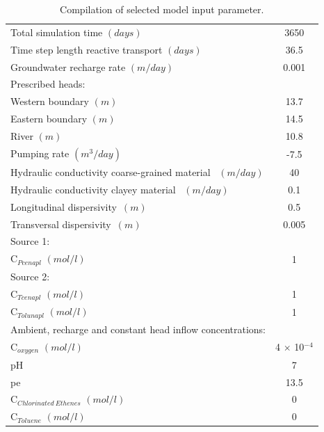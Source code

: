 \begin{table}
\caption{Compilation of selected model input parameter.}
\begin{center}
\begin{tabular}{lc} \hline
Total simulation time $(days)$       & 3650  \\
Time step length reactive transport $(days)$   & 36.5 \\
Groundwater recharge rate $(m/day)$   & 0.001 \\ 
\midrule 
Prescribed heads: & \\
Western boundary  $(m)$  &  13.7 \\
Eastern boundary  $(m)$  &  14.5 \\ 
River  $(m)$  &  10.8 \\
\midrule 
Pumping rate $(m^3/day)$ &      -7.5 \\
Hydraulic conductivity coarse-grained material \    $(m/day)$         &  40            \\
Hydraulic conductivity clayey material         \    $(m/day)$         &  0.1            \\  
Longitudinal dispersivity\ $(m)         $         &  0.5                               \\ 
Transversal  dispersivity\ $(m)         $         &  0.005   \\
\midrule                           
Source 1: & \\ 
C$_{Pcenapl}$    $(mol/l)$                    &  1  \\ 
\midrule 
Source 2: & \\ 
C$_{Tcenapl}$    $(mol/l)$                  &  1  \\
C$_{Tolunapl}$   $(mol/l)$                  &  1  \\ 
\midrule 
Ambient, recharge and constant head inflow concentrations: & \\ 
C$_{oxygen}$     $(mol/l)$                  &  4 $\times$ 10$^{-4}$  \\  
pH &   7 \\
pe &  13.5 \\
C$_{Chlorinated\ Ethenes}$  $(mol/l)$  &    0 \\
C$_{Toluene}$  $(mol/l)$  &    0 \\
\hline

\end{tabular}
\label{ex_6_input}
\end{center}
\end{table}

  









